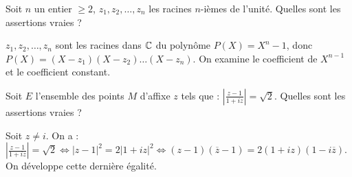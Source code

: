 \begin{question} 

Soit $n$ un entier $\ge 2$, $z_1,z_2, \dots, z_n$ les racines $n$-ièmes de l'unité. Quelles sont les assertions vraies ?
\begin{answers}
    
    
    
    
    
     

\end{answers}
\begin{explanations}
$z_1,z_2, \dots, z_n$ sont les racines dans $\mathbb{C}$ du polynôme $P(X) =X^n-1$, donc $P(X)=(X-z_1)(X-z_2)\dots (X-z_n)$. 
On examine le coefficient de $X^{n-1}$ et le coefficient constant.
\end{explanations}

\end{question}


\begin{question} 

Soit $E$ l'ensemble des points $M$ d'affixe $z$ tels que : $|\frac{z-1}{1+iz}|=\sqrt 2$. Quelles sont les assertions vraies ?
\begin{answers}
    
    
    
    
    
     

\end{answers}
\begin{explanations}
Soit $z \neq i$. On a :  $|\frac{z-1}{1+iz}|=\sqrt 2 \Leftrightarrow |z-1|^2=2|1+iz|^2 \Leftrightarrow
(z-1)(\overline{z}-1)=2 (1+iz)(1-i\overline{z})$. On développe cette dernière égalité.
\end{explanations}

\end{question}


